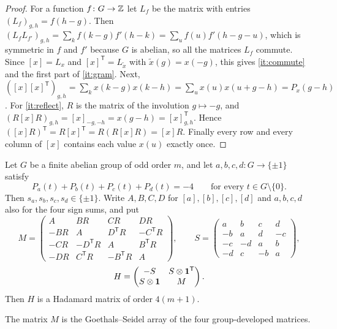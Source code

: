 \documentclass[11pt,colorlinks]{charlie}
\newcommand{\T}{\mathsf T}
\newcommand{\dev}[1]{[#1]}
\begin{document}
\begin{proof}
For a function $f\colon G\to\mathbb{Z}$ let $L_f$ be the matrix with entries $(L_f)_{g,h}=f(h-g)$. Then $(L_fL_{f'})_{g,h}=\sum_k f(k-g)f'(h-k)=\sum_u f(u)f'(h-g-u)$, which is symmetric in $f$ and $f'$ because $G$ is abelian, so all the matrices $L_f$ commute. Since $\dev x=L_x$ and $\dev x^{\T}=L_{\tilde x}$ with $\tilde x(g)=x(-g)$, this gives \ref{it:commute} and the first part of \ref{it:gram}. Next, $(\dev x\dev x^{\T})_{g,h}=\sum_k x(k-g)x(k-h)=\sum_u x(u)x(u+g-h)=P_x(g-h)$. For \ref{it:reflect}, $R$ is the matrix of the involution $g\mapsto-g$, and $(R\dev xR)_{g,h}=\dev x_{-g,-h}=x(g-h)=\dev x^{\T}_{g,h}$. Hence $(\dev xR)^{\T}=R\dev x^{\T}=R(R\dev xR)=\dev xR$. Finally every row and every column of $\dev x$ contains each value $x(u)$ exactly once.
\end{proof}

\begin{theorem}\label{thm:bordered}
Let $G$ be a finite abelian group of odd order $m$, and let $a,b,c,d\colon G\to\{\pm1\}$ satisfy
\begin{equation}\label{eq:paf}
P_a(t)+P_b(t)+P_c(t)+P_d(t)=-4\qquad\text{for every }t\in G\setminus\{0\}.
\end{equation}
Then $s_a,s_b,s_c,s_d\in\{\pm1\}$. Write $A,B,C,D$ for $\dev a,\dev b,\dev c,\dev d$ and $a,b,c,d$ also for the four sign sums, and put
\[
M=\begin{pmatrix}
A&BR&CR&DR\\
-BR&A&D^{\T}R&-C^{\T}R\\
-CR&-D^{\T}R&A&B^{\T}R\\
-DR&C^{\T}R&-B^{\T}R&A
\end{pmatrix},\qquad
S=\begin{pmatrix}
a&b&c&d\\
-b&a&d&-c\\
-c&-d&a&b\\
-d&c&-b&a
\end{pmatrix},
\]
\[
H=\begin{pmatrix}-S&S\otimes\one^{\T}\\ S\otimes\one&M\end{pmatrix}.
\]
Then $H$ is a Hadamard matrix of order $4(m+1)$.
\end{theorem}

The matrix $M$ is the Goethals--Seidel array \cite{GS} of the four group-developed matrices.
\end{document}
